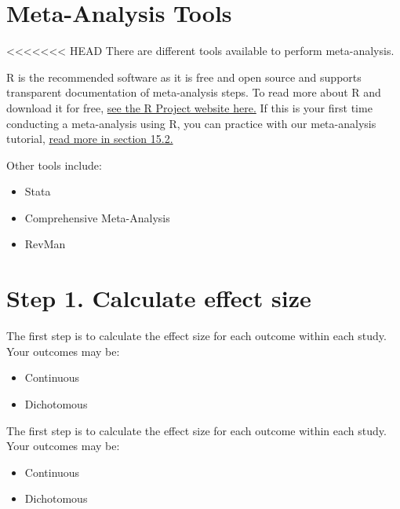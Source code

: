 \documentclass[
]{book}
\providecommand{\tightlist}{%
  \setlength{\itemsep}{0pt}\setlength{\parskip}{0pt}}
\begin{document}
\hypertarget{meta-analysis-tools}{%
\section{Meta-Analysis Tools}\label{meta-analysis-tools}}

\textless\textless\textless\textless\textless\textless\textless{} HEAD
There are different tools available to perform meta-analysis.

R is the recommended software as it is free and open source and supports transparent documentation of meta-analysis steps. To read more about R and download it for free, \href{https://www.r-project.org/}{see the R Project website here.}
If this is your first time conducting a meta-analysis using R, you can practice with our meta-analysis tutorial, \protect\hyperlink{meta-analysis-tutorial}{read more in section 15.2.}

Other tools include:

\begin{itemize}
\tightlist
\item
  Stata
\item
  Comprehensive Meta-Analysis
\item
  RevMan
\end{itemize}

\hypertarget{step-1.-calculate-effect-size}{%
\section{Step 1. Calculate effect size}\label{step-1.-calculate-effect-size}}

The first step is to calculate the effect size for each outcome within each study. Your outcomes may be:

\begin{itemize}
\tightlist
\item
  Continuous
\item
  Dichotomous
\end{itemize}

The first step is to calculate the effect size for each outcome within each study. Your outcomes may be:

\begin{itemize}
\tightlist
\item
  Continuous
\item
  Dichotomous
\end{itemize}
\end{document}
